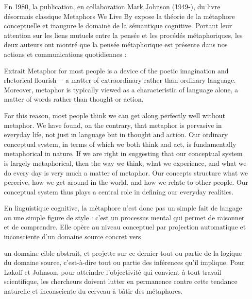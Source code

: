 En 1980, la publication, en collaboration Mark Johnson (1949-), du livre désormais classique Metaphors We Live By expose la théorie de la métaphore conceptuelle et inaugure le domaine de la sémantique cognitive. Portant leur attention sur les liens mutuels entre la pensée et les procédés métaphoriques, les deux auteurs ont montré que la pensée métaphorique est présente dans nos actions et communications quotidiennes : 
\begin{lecture}{Extrait}
Metaphor for most people is a device of the poetic imagination and rhetorical flourish— a matter of extraordinary rather than ordinary language. Moreover, metaphor is typically viewed as a characteristic of language alone, a matter of words rather than thought or action. 

For this reason, most people think we can get along perfectly well without metaphor. We have found, on the contrary, that metaphor is pervasive in everyday life, not just in language but in thought and action. Our ordinary conceptual system, in terms of which we both think and act, is fundamentally metaphorical in nature. If we are right in suggesting that our conceptual system is largely metaphorical, then the way we think, what we experience, and what we do every day is very much a matter of metaphor. Our concepts structure what we perceive, how we get around in the world, and how we relate to other people. Our conceptual system thus plays a central role in defining our everyday realities.
\end{lecture}
 En linguistique cognitive, la métaphore n’est donc pas un simple fait de langage ou une simple figure de style : c’est un processus mental qui permet de raisonner et de comprendre. Elle opère au niveau conceptuel par projection automatique et inconsciente d’un domaine source concret vers\par


un domaine cible abstrait, et projette sur ce dernier tout ou partie de la logique du domaine source, c’est-à-dire tout ou partie des inférences qu’il implique. Pour Lakoff et Johnson, pour atteindre l’objectivité qui convient à tout travail scientifique, les chercheurs doivent lutter en permanence contre cette tendance naturelle et inconsciente du cerveau à bâtir des métaphores.\par


